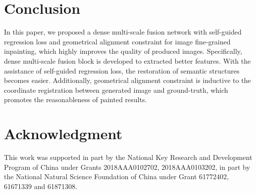 \documentclass[journal]{IEEEtran}
\begin{document}
\section{Conclusion}\label{sec:conclusion}

In this paper, we proposed a dense multi-scale fusion network with self-guided regression loss and geometrical alignment constraint for image fine-grained inpainting, which highly improves the quality of produced images. Specifically, dense multi-scale fusion block is developed to extracted better features. With the assistance of self-guided regression loss, the restoration of semantic structures becomes easier. Additionally, geometrical alignment constraint is inductive to the coordinate registration between generated image and ground-truth, which promotes the reasonableness of painted results.

\section*{Acknowledgment}
This work was supported in part by the National Key Research and Development Program of China under Grants 2018AAA0102702, 2018AAA0103202, in part by the National Natural Science Foundation of China under Grant 61772402, 61671339 and 61871308.


\end{document}
